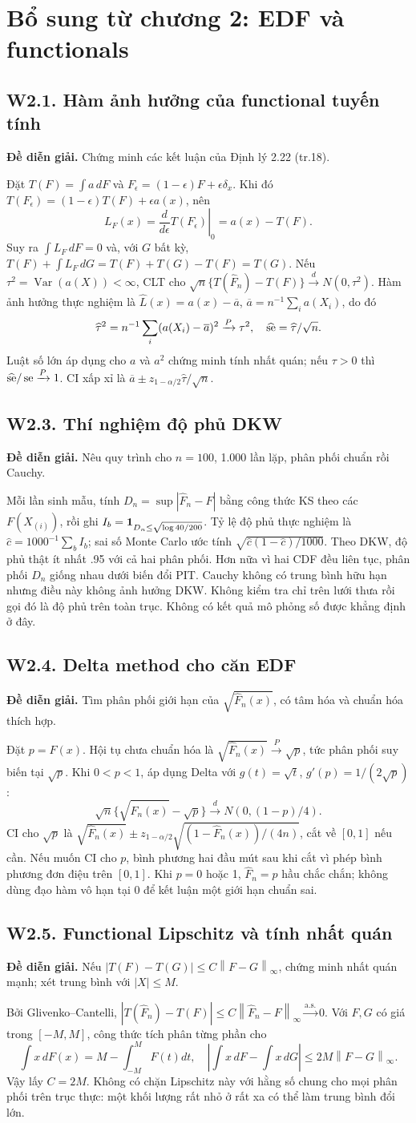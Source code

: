 \documentclass[11pt,a4paper]{article}
\DeclareMathOperator{\Var}{Var}\DeclareMathOperator{\Cov}{Cov}
\newcommand{\Fh}{\widehat F_n}\newcommand{\fh}{\widehat f_h}
\newcommand{\dto}{\xrightarrow{d}}\newcommand{\pto}{\xrightarrow{P}}
\newcommand{\asto}{\xrightarrow{\mathrm{a.s.}}}
\newcommand{\norm}[1]{\left\lVert#1\right\rVert}
\newcommand{\supp}[3]{\subsection{#1. #2}\label{s:#1}\textbf{Đề diễn giải.} #3\par}
\begin{document}
\section{Bổ sung từ chương 2: EDF và functionals}
\supp{W2.1}{Hàm ảnh hưởng của functional tuyến tính}{Chứng minh các kết luận của Định lý 2.22 (tr.18).}
Đặt $T(F)=\int a\,dF$ và $F_\epsilon=(1-\epsilon)F+\epsilon\delta_x$. Khi đó
$T(F_\epsilon)=(1-\epsilon)T(F)+\epsilon a(x)$, nên
\[
L_F(x)=\left.\frac d{d\epsilon}T(F_\epsilon)\right|_{0}=a(x)-T(F).
\]
Suy ra $\int L_F\,dF=0$ và, với $G$ bất kỳ,
$T(F)+\int L_F\,dG=T(F)+T(G)-T(F)=T(G)$.
Nếu $\tau^2=\Var(a(X))<\infty$, CLT cho
$\sqrt n\{T(\Fh)-T(F)\}\dto N(0,\tau^2)$.
Hàm ảnh hưởng thực nghiệm là $\widehat L(x)=a(x)-\overline a$, $\overline a=n^{-1}\sum_i a(X_i)$, do đó
\[
\widehat\tau^2=n^{-1}\sum_i(a(X_i)-\overline a)^2\pto\tau^2,
\quad\widehat{\se}=\widehat\tau/\sqrt n.
\]
Luật số lớn áp dụng cho $a$ và $a^2$ chứng minh tính nhất quán; nếu $\tau>0$ thì $\widehat{\se}/\se\pto1$. CI xấp xỉ là $\overline a\pm z_{1-\alpha/2}\widehat\tau/\sqrt n$.

\supp{W2.3}{Thí nghiệm độ phủ DKW}{Nêu quy trình cho $n=100$, 1.000 lần lặp, phân phối chuẩn rồi Cauchy.}
Mỗi lần sinh mẫu, tính $D_n=\sup|\Fh-F|$ bằng công thức KS theo các $F(X_{(i)})$, rồi ghi $I_b=\mathbf 1_{D_n\le\sqrt{\log40/200}}$. Tỷ lệ độ phủ thực nghiệm là $\widehat c=1000^{-1}\sum_bI_b$; sai số Monte Carlo ước tính $\sqrt{\widehat c(1-\widehat c)/1000}$.
Theo DKW, độ phủ thật ít nhất .95 với cả hai phân phối. Hơn nữa vì hai CDF đều liên tục, phân phối $D_n$ giống nhau dưới biến đổi PIT. Cauchy không có trung bình hữu hạn nhưng điều này không ảnh hưởng DKW. Không kiểm tra chỉ trên lưới thưa rồi gọi đó là độ phủ trên toàn trục. Không có kết quả mô phỏng số được khẳng định ở đây.

\supp{W2.4}{Delta method cho căn EDF}{Tìm phân phối giới hạn của $\sqrt{\Fh(x)}$, có tâm hóa và chuẩn hóa thích hợp.}
Đặt $p=F(x)$. Hội tụ chưa chuẩn hóa là $\sqrt{\Fh(x)}\pto\sqrt p$, tức phân phối suy biến tại $\sqrt p$. Khi $0<p<1$, áp dụng Delta với $g(t)=\sqrt t$, $g'(p)=1/(2\sqrt p)$:
\[
\sqrt n\{\sqrt{\Fh(x)}-\sqrt p\}\dto N(0,(1-p)/4).
\]
CI cho $\sqrt p$ là $\sqrt{\Fh(x)}\pm z_{1-\alpha/2}\sqrt{(1-\Fh(x))/(4n)}$, cắt về $[0,1]$ nếu cần. Nếu muốn CI cho $p$, bình phương hai đầu mút sau khi cắt vì phép bình phương đơn điệu trên $[0,1]$. Khi $p=0$ hoặc 1, $\Fh=p$ hầu chắc chắn; không dùng đạo hàm vô hạn tại 0 để kết luận một giới hạn chuẩn sai.

\supp{W2.5}{Functional Lipschitz và tính nhất quán}{Nếu $|T(F)-T(G)|\le C\norm{F-G}_\infty$, chứng minh nhất quán mạnh; xét trung bình với $|X|\le M$.}
Bởi Glivenko--Cantelli,
$|T(\Fh)-T(F)|\le C\norm{\Fh-F}_\infty\asto0$.
Với $F,G$ có giá trong $[-M,M]$, công thức tích phân từng phần cho
\[
\int x\,dF(x)=M-\int_{-M}^{M}F(t)dt,
\quad
\left|\int x\,dF-\int x\,dG\right|\le2M\norm{F-G}_\infty.
\]
Vậy lấy $C=2M$. Không có chặn Lipschitz này với hằng số chung cho mọi phân phối trên trục thực: một khối lượng rất nhỏ ở rất xa có thể làm trung bình đổi lớn.
\end{document}
